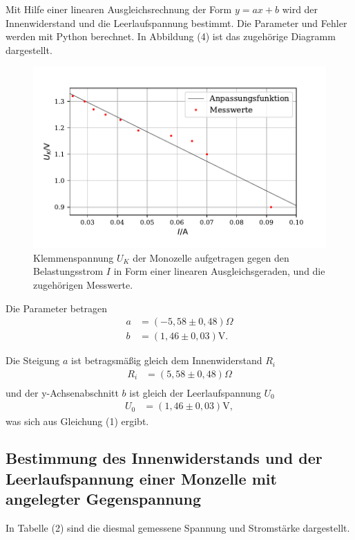 \noindent Mit Hilfe einer linearen Ausgleichsrechnung der Form $y = ax + b $
wird der Innenwiderstand und die Leerlaufspannung bestimmt. Die Parameter und Fehler werden mit Python berechnet.
In Abbildung (4) ist das zugehörige Diagramm dargestellt.
\begin{figure}[H]
  \centering
  \includegraphics{plot1.pdf}
  \caption{Klemmenspannung $U_K$ der Monozelle aufgetragen gegen den Belastungsstrom $I$ in Form einer linearen Ausgleichsgeraden, und die zugehörigen Messwerte.}
  \label{fig:rechteck}
\end{figure}

\noindent Die Parameter betragen
\begin{align*}
a &= (-5,58 \pm 0,48)\Omega \\
b &= (1,46 \pm 0,03)\si{\volt} .
\end{align*}

\noindent Die Steigung $a$ ist betragsmäßig gleich dem Innenwiderstand $R_i$
\begin{align*}
R_i &= (5,58 \pm 0,48)\Omega \\
\end{align*}
\noindent und der y-Achsenabschnitt $b$ ist gleich der Leerlaufspannung $U_0$
\begin{align*}
U_0 &= (1,46 \pm 0,03)\si{\volt} ,
\end{align*} 
\noindent was sich aus Gleichung (1) ergibt.

\subsection{Bestimmung des Innenwiderstands und der Leerlaufspannung einer Monzelle mit angelegter Gegenspannung}
In Tabelle (2) sind die diesmal gemessene Spannung und Stromstärke dargestellt.

